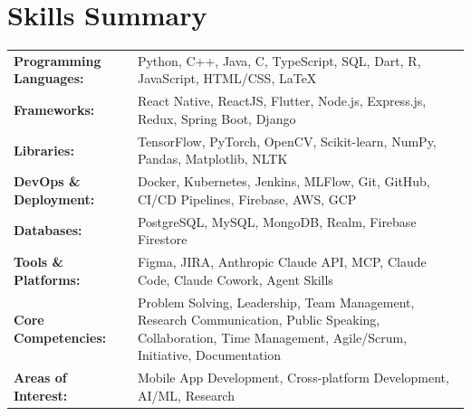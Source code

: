 \documentclass{article}
\begin{document}
\section{Skills Summary}
\small
\renewcommand{\arraystretch}{0.8}
\begin{tabular}{p{4.8cm}p{13.5cm}}
  \textbf{Programming Languages:} & Python, C++, Java, C, TypeScript, SQL, Dart, R, JavaScript, HTML/CSS, LaTeX \\
  \textbf{Frameworks:} & React Native, ReactJS, Flutter, Node.js, Express.js, Redux, Spring Boot, Django \\
  \textbf{Libraries:} & TensorFlow, PyTorch, OpenCV, Scikit-learn, NumPy, Pandas, Matplotlib, NLTK \\
  \textbf{DevOps \& Deployment:} & Docker, Kubernetes, Jenkins, MLFlow, Git, GitHub, CI/CD Pipelines, Firebase, AWS, GCP \\
  \textbf{Databases:} & PostgreSQL, MySQL, MongoDB, Realm, Firebase Firestore \\
  \textbf{Tools \& Platforms:} & Figma, JIRA, Anthropic Claude API, MCP, Claude Code, Claude Cowork, Agent Skills \\
  \textbf{Core Competencies:} & Problem Solving, Leadership, Team Management, Research Communication, Public Speaking, Collaboration, Time Management, Agile/Scrum, Initiative, Documentation \\
  \textbf{Areas of Interest:} & Mobile App Development, Cross-platform Development, AI/ML, Research \\
\end{tabular}


\end{document}
